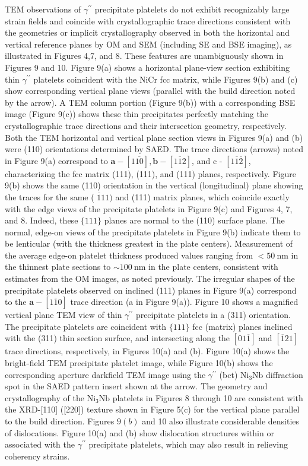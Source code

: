 \documentclass[10pt]{article}
\begin{document}
TEM observations of $\gamma^{\prime \prime}$ precipitate platelets do not exhibit recognizably large strain fields and coincide with crystallographic trace directions consistent with the geometries or implicit crystallography observed in both the horizontal and vertical reference planes by OM and SEM (including SE and BSE imaging), as illustrated in Figures 4,7, and 8. These features are unambiguously shown in Figures 9 and 10. Figure 9(a) shows a horizontal plane-view section exhibiting thin $\gamma^{\prime \prime}$ platelets coincident with the NiCr fcc matrix, while Figures 9(b) and (c) show corresponding vertical plane views (parallel with the build direction noted by the arrow). A TEM column portion (Figure 9(b)) with a corresponding BSE image (Figure 9(c)) shows these thin precipitates perfectly matching the crystallographic trace directions and their intersection geometry, respectively. Both the TEM horizontal and vertical plane section views in Figures 9(a) and (b) were (110) orientations determined by SAED. The trace directions (arrows) noted in Figure 9(a) correspond to $\mathbf{a}-[1 \overline{10}], \mathbf{b}-[1 \overline{1} 2]$, and c - $[1 \overline{1} \overline{2}]$, characterizing the fcc matrix (111), (111), and (111) planes, respectively. Figure 9(b) shows the same (110) orientation in the vertical (longitudinal) plane showing the traces for the same ( $\overline{1} 11)$ and (111) matrix planes, which coincide exactly with the edge views of the precipitate platelets in Figure 9(c) and Figures 4, 7, and 8. Indeed, these $\{111\}$ planes are normal to the (110) surface plane. The normal, edge-on views of the precipitate platelets in Figure 9(b) indicate them to be lenticular (with the thickness greatest in the plate centers). Measurement of the average edge-on platelet thickness produced values ranging from $<50 \mathrm{~nm}$ in the thinnest plate sections to $\sim 100 \mathrm{~nm}$ in the plate centers, consistent with estimates from the OM images, as noted previously. The irregular shapes of the precipitate platelets observed on inclined (111) planes in Figure 9(a) correspond to the $\mathbf{a}-[1 \overline{1} 0]$ trace direction (a in Figure 9(a)). Figure 10 shows a magnified vertical plane TEM view of thin $\gamma^{\prime \prime}$ precipitate platelets in a (311) orientation. The precipitate platelets are coincident with $\{111\}$ fcc (matrix) planes inclined with the (311) thin section surface, and intersecting along the $[01 \overline{1}]$ and $[\overline{1} 21]$ trace directions, respectively, in Figures 10(a) and (b). Figure 10(a) shows the bright-field TEM precipitate platelet image, while Figure 10(b) shows the corresponding aperture darkfield TEM image using the $\gamma^{\prime \prime}$ (bct) $\mathrm{Ni}_{3} \mathrm{Nb}$ diffraction spot in the SAED pattern insert shown at the arrow. The geometry and crystallography of the $\mathrm{Ni}_{3} \mathrm{Nb}$ platelets in Figures 8 through 10 are consistent with the XRD-[110] ([220]) texture shown in Figure 5(c) for the vertical plane parallel to the build direction. Figures $9(b)$ and 10 also illustrate considerable densities of dislocations. Figure 10(a) and (b) show dislocation structures within or associated with the $\gamma^{\prime \prime}$ precipitate platelets, which may also result in relieving coherency strains.
\end{document}
